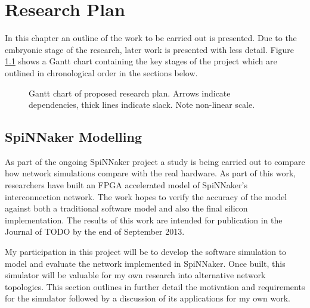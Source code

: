 \chapter{Research Plan}
	
	In this chapter an outline of the work to be carried out is presented. Due to
	the embryonic stage of the research, later work is presented with less detail.
	Figure \ref{fig:plan-gantt} shows a Gantt chart containing the key stages of
	the project which are outlined in chronological order in the sections below.
	
	\begin{figure}[b!]
		\center
		
		
		\caption[Gantt chart of proposed research plan]{Gantt chart of proposed
		research plan. Arrows indicate dependencies, thick lines indicate slack.
		Note non-linear scale.}
		\label{fig:plan-gantt}
	\end{figure}
	
	
	\section{SpiNNaker Modelling}
		
		
		
		As part of the ongoing SpiNNaker project a study is being carried out to
		compare how network simulations compare with the real hardware. As part of
		this work, researchers have built an FPGA accelerated model of SpiNNaker's
		interconnection network. The work hopes to verify the accuracy of the model
		against both a traditional software model and also the final silicon
		implementation. The results of this work are intended for publication in the
		Journal of TODO by the end of September 2013.
		
		My participation in this project will be to develop the software simulation
		to model and evaluate the network implemented in SpiNNaker. Once built, this
		simulator will be valuable for my own research into alternative network
		topologies.  This section outlines in further detail the motivation and
		requirements for the simulator followed by a discussion of its applications
		for my own work.
		
